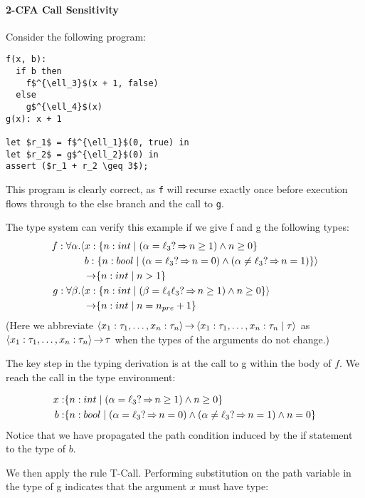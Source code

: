 \documentclass[runningheads]{llncs}
\begin{document}
\paragraph{2-CFA Call Sensitivity}

Consider the following program:
\begin{lstlisting}
f(x, b):
  if b then
    f$^{\ell_3}$(x + 1, false)
  else
    g$^{\ell_4}$(x)
g(x): x + 1

let $r_1$ = f$^{\ell_1}$(0, true) in
let $r_2$ = g$^{\ell_2}$(0) in
assert ($r_1 + r_2 \geq 3$);
\end{lstlisting}

This program is clearly correct, as \lstinline{f} will recurse exactly once before execution
flows through to the else branch and the call to \lstinline{g}.

The type system can verify this example if we give f and g the following types:
\begin{align*}
  f: \forall \alpha.\langle&x: \{ n : int \mid (\alpha = \ell_3? \operatorname{\Rightarrow} n \geq 1) \wedge n \geq 0 \} \\
                           &b: \{ n: bool \mid (\alpha = \ell_3? \operatorname{\Rightarrow} n = 0) \wedge (\alpha \neq \ell_3? \operatorname{\Rightarrow} n = 1) \}\rangle \\
                           & \operatorname{\rightarrow} \{ n : int \mid n > 1 \} \\
  g: \forall \beta.\langle&x: \{ n : int \mid (\beta = \ell_4\ell_3? \operatorname{\Rightarrow} n \geq 1) \wedge n \geq 0 \}\rangle \\
                           & \operatorname{\rightarrow} \{ n: int \mid n = n_{pre} + 1\}
\end{align*}
(Here we abbreviate $\left\langle{x_1:\tau_1,\ldots,x_n:\tau_n}\right\rangle \operatorname{\rightarrow} \left\langle{x_1:\tau_1,\ldots,x_n:\tau_n\mid \tau}\right\rangle$ as $\left\langle{x_1:\tau_1,\ldots,x_n:\tau_n}\right\rangle \operatorname{\rightarrow} \tau$ when the types of the arguments
do not change.)

The key step in the typing derivation is at the call to g within the body of $f$. We reach the
call in the type environment:

\begin{align*}
  x: & \{ n : int \mid (\alpha = \ell_3? \operatorname{\Rightarrow} n \geq 1) \wedge n \geq 0 \} \\
  b: & \{ n: bool \mid (\alpha = \ell_3? \operatorname{\Rightarrow} n = 0) \wedge (\alpha \neq \ell_3? \operatorname{\Rightarrow} n = 1) \wedge n = 0 \}
\end{align*}
Notice that we have propagated the path condition induced by the if
statement to the type of $b$.

We then apply the rule T-Call. Performing substitution on the path variable in the type
of g indicates that the argument $x$ must have type:
\end{document}
